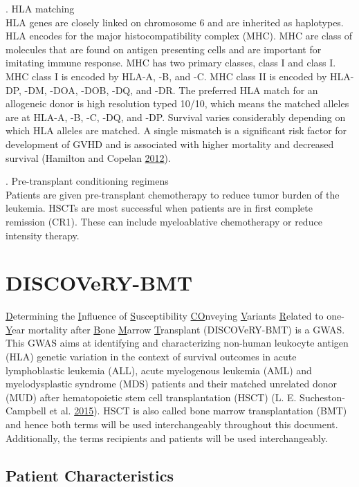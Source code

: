 \documentclass[]{DissertateOSU}
\begin{document}
. HLA matching\\
HLA genes are closely linked on chromosome 6 and are inherited as
haplotypes. HLA encodes for the major histocompatibility complex (MHC).
MHC are class of molecules that are found on antigen presenting cells
and are important for imitating immune response. MHC has two primary
classes, class I and class I. MHC class I is encoded by HLA-A, -B, and
-C. MHC class II is encoded by HLA-DP, -DM, -DOA, -DOB, -DQ, and -DR.
The preferred HLA match for an allogeneic donor is high resolution typed
10/10, which means the matched alleles are at HLA-A, -B, -C, -DQ, and
-DP. Survival varies considerably depending on which HLA alleles are
matched. A single mismatch is a significant risk factor for development
of GVHD and is associated with higher mortality and decreased survival
(Hamilton and Copelan \protect\hyperlink{ref-hamilton_2012}{2012}).

. Pre-transplant conditioning regimens\\
Patients are given pre-transplant chemotherapy to reduce tumor burden of
the leukemia. HSCTs are most successful when patients are in first
complete remission (CR1). These can include myeloablative chemotherapy
or reduce intensity therapy.

\section{DISCOVeRY-BMT}\label{discovery-bmt}

\underline{D}etermining the \underline{I}nfluence of
\underline{S}usceptibility \underline{CO}nveying \underline{V}ariants
\underline{R}elated to one-\underline{Y}ear mortality after
\underline{B}one \underline{M}arrow \underline{T}ransplant
(DISCOVeRY-BMT) is a GWAS. This GWAS aims at identifying and
characterizing non-human leukocyte antigen (HLA) genetic variation in
the context of survival outcomes in acute lymphoblastic leukemia (ALL),
acute myelogenous leukemia (AML) and myelodysplastic syndrome (MDS)
patients and their matched unrelated donor (MUD) after hematopoietic
stem cell transplantation (HSCT) (L. E. Sucheston-Campbell et al.
\protect\hyperlink{ref-lsc_2015}{2015}). HSCT is also called bone marrow
transplantation (BMT) and hence both terms will be used interchangeably
throughout this document. Additionally, the terms recipients and
patients will be used interchangeably.

\subsection{Patient Characteristics}\label{patient-characteristics}
\end{document}
